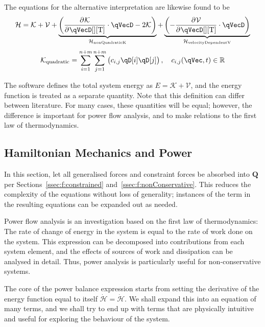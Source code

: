 \documentclass[11pt]{article}
\newcommand{\secrefTwo}[2]{Sections~\ref{#1} and~\ref{#2}}
\newcommand{\pD}[2]{
    \frac{\partial\mspace{1mu}#1}{\partial\mspace{1mu}#2}
}
\begin{document}
The equations for the alternative interpretation are likewise found to be
\begin{equation} \label{eq:f:H_expanded}
    \mathcal{H}
    = \mathcal{K} + \mathcal{V}
        + \underbrace{\del{\pD{\mathcal{K}}{\qVecD[][\mathrm{T}]} \cdot \qVecD - 2\mathcal{K}}}_{\mathcal{H}_{\mathrm{nonQuadraticK}}}
        + \underbrace{\del{- \pD{\mathcal{V}}{\qVecD[][\mathrm{T}]} \cdot \qVecD}}_{\mathcal{H}_{\mathrm{velocityDependentV}}}
\end{equation}
\begin{equation}
    \mathcal{K}_{\mathrm{quadratic}} = \sum_{i=1}^{n+m}\sum_{j=1}^{n+m}\del{c_{i,j}\qD[i]\qD[j]}
    ,\quad c_{i,j}(\qVec, t)\in\mathbb{R}
\end{equation}

The software defines the total system energy as $E = \mathcal{K} + \mathcal{V}$, and the energy function is treated as a separate quantity. Note that this definition can differ between literature. For many cases, these quantities will be equal; however, the difference is important for power flow analysis, and to make relations to the first law of thermodynamics.


\subsection{Hamiltonian Mechanics and Power} \label{ssec:f:power}
In this section, let all generalised forces and constraint forces be absorbed into $\mathbf{Q}$ per \secrefTwo{ssec:f:constrained}{ssec:f:nonConservative}. This reduces the complexity of the equations without loss of generality; instances of the term in the resulting equations can be expanded out as needed.

Power flow analysis is an investigation based on the first law of thermodynamics: The rate of change of energy in the system is equal to the rate of work done on the system. This expression can be decomposed into contributions from each system element, and the effects of sources of work and dissipation can be analysed in detail. Thus, power analysis is particularly useful for non-conservative systems.

The core of the power balance expression starts from setting the derivative of the energy function equal to itself $\dot{\mathcal{H}}=\dot{\mathcal{H}}$. We shall expand this into an equation of many terms, and we shall try to end up with terms that are physically intuitive and useful for exploring the behaviour of the system.
\end{document}

